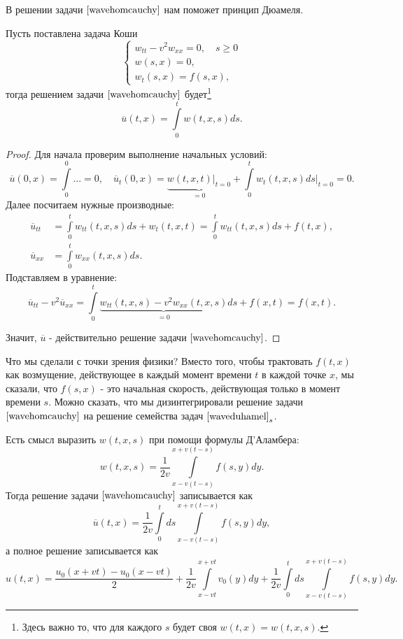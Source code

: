 В решении задачи $\eqref{wavehomcauchy}$ нам поможет принцип Дюамеля.
\begin{theorem}[Дюамель] Пусть поставлена задача Коши
\begin{equation}
	\begin{cases}
		w_{tt} - v^2 w_{xx} = 0,\quad s \geq 0 \\
		w(s,x) = 0, \\
		w_t(s,x) = f(s,x),
	\end{cases}
\label{waveduhamel}
\end{equation}
тогда решением задачи $\eqref{wavehomcauchy}$ будет\footnote{Здесь важно то, что для каждого $s$ будет своя $w(t,x) = w(t,x,s)$.}
$$ \overline{u}(t,x) = \int \limits_0^t w(t,x,s) ds.$$
\end{theorem}
\begin{proof}
Для начала проверим выполнение начальных условий:
$$\overline{u} (0,x) = \int \limits_0^0 ... = 0, \quad \overline{u}_t (0,x) = \underbrace {w(t,x,t) \Bigg\rvert_{t=0}}_{= 0} + \int \limits_0^t w_t(t,x,s)ds \Bigg\rvert_{t=0} = 0.$$
Далее посчитаем нужные производные:
\begin{align*}
	\overline{u}_{tt} &= \int \limits_0^t w_{tt} (t,x,s) ds + w_t (t, x, t) = \int \limits_0^t w_{tt} (t,x,s)ds + f(t,x), \\
	\overline{u}_{xx} &= \int \limits_0^t w_{xx} (t,x,s) ds.
\end{align*}
Подставляем в уравнение:
$$ \overline{u}_{tt} - v^2 \overline{u}_{xx} = \int \limits_0^t \underbrace{w_{tt}(t,x,s) - v^2 w_{xx}(t,x,s)}_{= 0} ds + f(x,t) = f(x,t).$$

Значит, $\overline{u}$ - действительно решение задачи $\eqref{wavehomcauchy}$.

\end{proof}
Что мы сделали с точки зрения физики? Вместо того, чтобы трактовать $f(t,x)$ как возмущение, действующее в каждый момент времени $t$ в каждой точке $x$, мы сказали, что $f(s,x)$ - это начальная скорость, действующая только в момент времени $s$. Можно сказать, что мы дизинтегрировали решение задачи $\eqref{wavehomcauchy}$ на решение семейства задач $\eqref{waveduhamel}_s$.

Есть смысл выразить $w(t,x,s)$ при помощи формулы Д'Аламбера:
$$ w(t,x,s) = \frac {1} {2v} \int \limits_{x-v(t-s)}^{x+v(t-s)} f(s,y) dy. $$
Тогда решение задачи  $\eqref{wavehomcauchy}$ записывается как
$$ \overline{u} (t,x) = \frac {1} {2v} \int \limits_0^t ds \int \limits_{x-v(t-s)}^{x+v(t-s)} f(s,y) dy,$$
а полное решение записывается как $$u(t,x) = \frac {u_0 (x+vt) - u_0 (x-vt)} {2} + \frac {1} {2v} \int \limits_{x-vt}^{x+vt} v_0(y)dy + \frac {1} {2v} \int \limits_0^t ds \int \limits_{x-v(t-s)}^{x+v(t-s)} f(s,y) dy.$$

